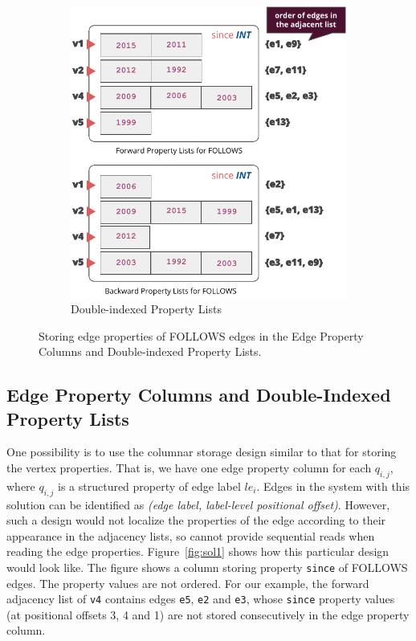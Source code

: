 \begin{figure}
\begin{subfigure}{0.55\textwidth}
		\includegraphics[scale=0.69]{img/sol2}
		\captionsetup{justification=centering}
		\caption{Double-indexed Property Lists}
		\label{fig:sol2}
	\end{subfigure}
	\captionsetup{justification=centering}
	\caption{Storing edge properties of FOLLOWS edges in the Edge Property Columns and Double-indexed Property Lists.}
	\label{fig:sol1and2}
\end{figure}


\subsection{Edge Property Columns and Double-Indexed Property Lists}

 One possibility is to use the columnar storage design similar to that for storing the vertex properties. That is, we have one edge property column for each $q_{i,j}$, where $q_{i,j}$ is a structured property of edge label $le_i$. Edges in the system with this solution can be identified as \emph{(edge label, label-level positional offset)}. However, such a design would not localize the properties of the edge according to their appearance in the adjacency lists, so cannot provide sequential reads when reading the edge properties. Figure~\ref{fig:sol1} shows how this particular design would look like. The figure shows a column storing property \texttt{since} of FOLLOWS edges. The property values are not ordered. For our example, the forward adjacency list of \texttt{v4} contains edges \texttt{e5}, \texttt{e2} and \texttt{e3}, whose \texttt{since} property values (at positional offsets 3, 4 and 1) are not stored consecutively in the edge property column. 

